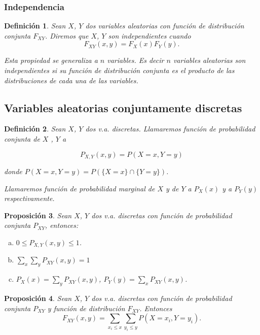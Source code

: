 \documentclass[12pt]{report}
\newtheorem{definition}{Definici\'on}
\newtheorem{proposition}[definition]{Proposici\'on}
\begin{document}
\subsubsection{Independencia}

  \begin{definition}
Sean $X$, $Y$ dos variables aleatorias con función de distribución conjunta $F_{X  Y}$. Diremos que $X$, $Y$ son independientes cuando $$F_{X Y}(x,y)=F_X(x) F_Y(y).$$

Esta propiedad se generaliza a $n$ variables. Es decir $n$ variables aleatorias son independientes si su función de distribución conjunta es el producto de las  distribuciones de cada una de las variables.
  \end{definition}


\subsection{Variables aleatorias conjuntamente discretas}

\begin{definition} Sean $X$, $Y$ dos v.a. discretas. Llamaremos función de probabilidad
conjunta de $X$ , $Y$ a

$$P_{X,Y}(x,y)=P(X=x,Y=y)$$

donde $P(X=x,Y=y)=P(\{X=x\}\cap \{Y=y\})$.

Llamaremos función de probabilidad marginal de $X$ y de $Y$ a $P_X(x)$ y a $P_Y(y)$
respectivamente.
\end{definition}


\begin{proposition} Sean $X$, $Y$ dos v.a. discretas con función de probabilidad conjunta
$P_{X Y}$, entonces:

\begin{enumerate}[a)]
\item $0 \leq P_{X,Y}(x,y)\leq 1$.
\item $\sum_{x}\sum_y P_{X Y}(x,y)=1$
\item $P_X(x)=\sum_{y}P_{X Y}(x,y)$,  $P_Y(y)=\sum_{x}P_{X Y}(x,y)$.
\end{enumerate}
\end{proposition}




\begin{proposition} Sean $X$, $Y$ dos v.a. discretas con función de probabilidad conjunta
$P_{X Y}$ y función de distribución $F_{X Y}$. Entonces $$F_{X Y }(x,y)=\sum_{x_i\leq
x}\sum_{y_i\leq y} P(X=x_i,Y=y_i).$$
\end{proposition}
\end{document}
